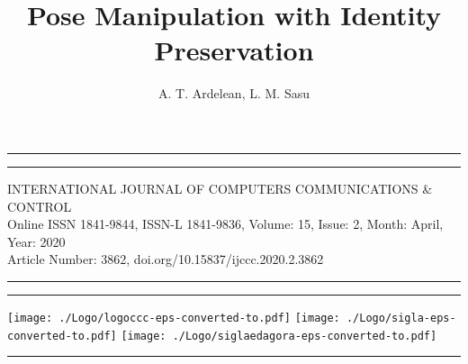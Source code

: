 \documentclass[11pt,a4paper]{article}
\newcommand{\theyear}{2020}
\newcommand{\themonth}{April}
\newcommand{\thejournallong}{INTERNATIONAL JOURNAL OF COMPUTERS COMMUNICATIONS \& CONTROL}
\newcommand{\theonlineissn}{1841-9844}
\newcommand{\theissn}{1841-9836}
\newcommand{\thevolume}{15}
\newcommand{\theissue}{2}
\newcommand{\thedoi}{doi.org/10.15837/ijccc.2020.2.3862}
\newcommand{\theartnum}{3862}
\begin{document}
\thispagestyle{firstpage}
\vspace*{\dimexpr-\headheight-\headsep}\hrule\vspace{0.1cm}\hrule\vspace{0.2cm}
            \thejournallong\\
            Online ISSN \theonlineissn, ISSN-L \theissn, Volume: \thevolume, Issue: \theissue, Month: \themonth, Year: \theyear\\
            Article Number: \theartnum, \thedoi\\
        \hrule\vspace{0.1cm}\hrule\vspace{0.2cm}
        \texttt{[image: ./Logo/logoccc-eps-converted-to.pdf]}
            \hspace{3.2cm}
        \texttt{[image: ./Logo/sigla-eps-converted-to.pdf]}
            \hspace{3.2cm}
        \texttt{[image: ./Logo/siglaedagora-eps-converted-to.pdf]}\\
        \hrule\



\title{Pose Manipulation with Identity Preservation}


\author{A. T. Ardelean, L. M. Sasu}
\date{}
{\let\newpage\relax 
\maketitle}
\thispagestyle{firstpage} 
\end{document}
